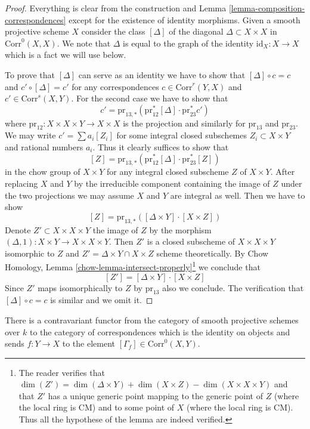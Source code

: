 \begin{proof}
Everything is clear from the construction and
Lemma \ref{lemma-composition-correspondences}
except for the existence of identity morphisms.
Given a smooth projective scheme $X$ consider
the class $[\Delta]$ of the diagonal $\Delta \subset X \times X$
in $\text{Corr}^0(X, X)$. We note that $\Delta$ is
equal to the graph of the identity $\text{id}_X : X \to X$
which is a fact we will use below.

\medskip\noindent
To prove that $[\Delta]$ can serve as an identity we have to show that
$[\Delta] \circ c = c$ and $c' \circ [\Delta] = c'$ for any correspondences
$c \in \text{Corr}^r(Y, X)$ and $c' \in \text{Corr}^s(X, Y)$.
For the second case we have to show that
$$
c' = \text{pr}_{13, *}(\text{pr}_{12}^*[\Delta] \cdot \text{pr}_{23}^*c')
$$
where $\text{pr}_{12} : X \times X \times Y \to X \times X$ is the
projection and similarly for $\text{pr}_{13}$ and $\text{pr}_{23}$.
We may write $c' = \sum a_i [Z_i]$ for some integral closed subschemes
$Z_i \subset X \times Y$ and rational numbers $a_i$. Thus it clearly
suffices to show that
$$
[Z] = \text{pr}_{13, *}(\text{pr}_{12}^*[\Delta] \cdot \text{pr}_{23}^*[Z])
$$
in the chow group of $X \times Y$ for any integral closed subscheme $Z$
of $X \times Y$. After replacing $X$ and $Y$ by the
irreducible component containing the image of $Z$ under the two projections
we may assume $X$ and $Y$ are integral as well. Then we have to show
$$
[Z] = \text{pr}_{13, *}([\Delta \times Y] \cdot [X \times Z])
$$
Denote $Z' \subset X \times X \times Y$ the image of $Z$ by the morphism
$(\Delta, 1) : X \times Y \to X \times X \times Y$. Then $Z'$
is a closed subscheme of $X \times X \times Y$ isomorphic to $Z$ and
$Z' = \Delta \times Y \cap X \times Z$ scheme theoretically.
By Chow Homology, Lemma \ref{chow-lemma-intersect-properly}\footnote{The
reader verifies that $\dim(Z') = \dim(\Delta \times Y) + \dim(X \times Z) -
\dim(X \times X \times Y)$ and that $Z'$ has a unique generic point
mapping to the generic point of $Z$ (where the local ring is CM)
and to some point of $X$ (where the local ring is CM). Thus all the
hypothese of the lemma are indeed verified.}
we conclude that
$$
[Z'] = [\Delta \times Y] \cdot [X \times Z]
$$
Since $Z'$ maps isomorphically to $Z$ by $\text{pr}_{13}$ also
we conclude. The verification that
$[\Delta] \circ c = c$ is similar and we omit it.
\end{proof}

\begin{lemma}
\label{lemma-contravariant-functor}
There is a contravariant functor from the category of smooth
projective schemes over $k$ to the category of correspondences
which is the identity on objects and sends $f : Y \to X$ to
the element $[\Gamma_f] \in \text{Corr}^0(X, Y)$.
\end{lemma}

